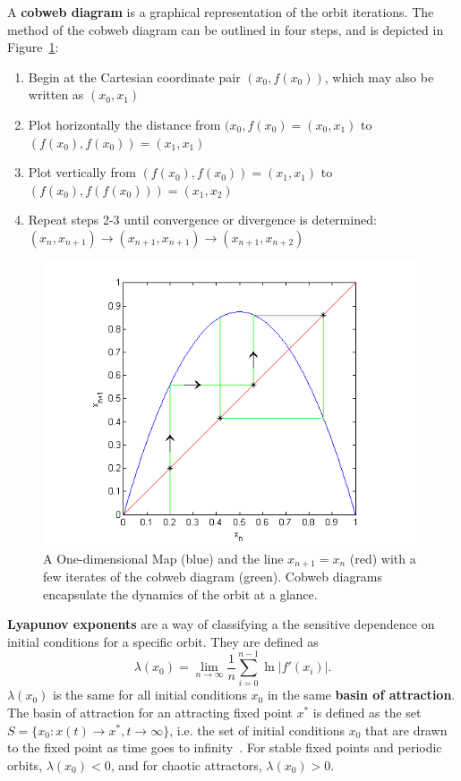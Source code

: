 A \textbf{cobweb diagram} is a graphical representation of the orbit
iterations. The method of the cobweb diagram can be outlined in four
steps, and is depicted in Figure~\ref{fig:cobex}:
\begin{enumerate}
\item Begin at the Cartesian coordinate pair $(x_0, f(x_0))$, which
  may also be written as $(x_0, x_1)$
\item Plot horizontally the distance from $(x_0, f(x_0)=(x_0, x_1)$ to $(f(x_0),
  f(x_0))=(x_1, x_1)$
\item Plot vertically from $(f(x_0), f(x_0))=(x_1, x_1)$ to $(f(x_0), f(f(x_0)))=(x_1, x_2)$
\item Repeat steps 2-3 until convergence or divergence is determined:
  $(x_n, x_{n+1}) \to (x_{n+1}, x_{n+1}) \to (x_{n+1},x_{n+2})$
\end{enumerate}
\begin{figure}[!h]
\caption[Example of a Cobweb Diagram]{A One-dimensional Map (blue) and
  the line $x_{n+1}=x_n$ (red) with a few iterates of the cobweb
  diagram (green). Cobweb diagrams encapsulate the dynamics of the orbit at a glance.}\label{fig:cobex}
    \begin{center}
	\includegraphics[scale=0.8]{figs/cobweb_ex.png}
    \end{center}
\end{figure}

\textbf{Lyapunov exponents} are a way of classifying a the sensitive
dependence on initial conditions for a specific orbit. They are
defined as 
\begin{equation}
\lambda(x_0) = \lim_{n \to \infty} \frac{1}{n} \sum_{i=0}^{n-1} \ln |f'(x_i)|.
\end{equation}
$\lambda(x_0)$ is the same for all initial conditions $x_0$ in the same \textbf{basin of
attraction}. The basin of attraction for an attracting fixed point
$x^*$ is defined as the set $S=\{x_0:x(t) \to x^*, t \to \infty\}$, i.e.
the set of initial conditions $x_0$ that are drawn to the fixed point
as time goes to infinity~\cite{strogatz}. For stable fixed points and periodic orbits, $\lambda(x_0) < 0$,
and for chaotic attractors, $\lambda(x_0)>0$.


